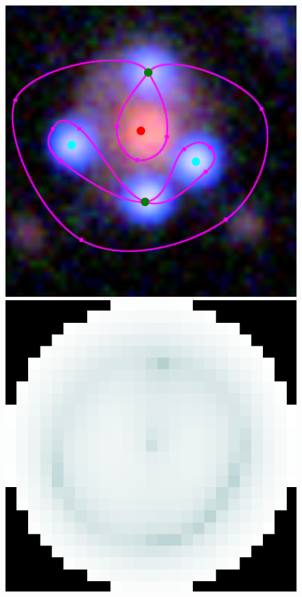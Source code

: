 \begin{figure}
  \centering


  \includegraphics[width=\myplotswidth]{fig/007022_input}
  \includegraphics[width=\myplotswidth]{fig/007022_arr_time} \\

\end{figure}
